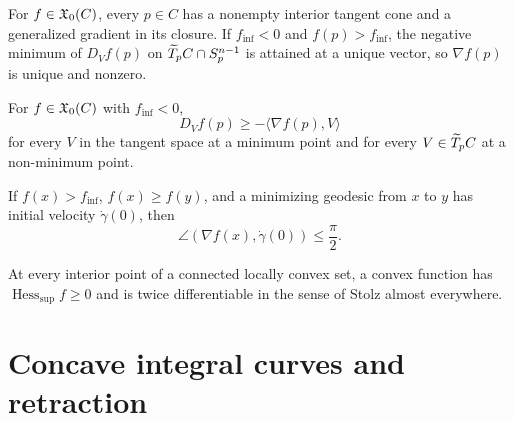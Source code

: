 \begin{lemma}
\label{lem:chow-iii-h36-unique-generalized-gradient}
For $f\in\mathfrak X_0(C)$, every $p\in C$ has a nonempty interior tangent cone and a
generalized gradient in its closure.  If $f_{\inf}<0$ and $f(p)>f_{\inf}$, the negative
minimum of $D_Vf(p)$ on $\widetilde T_pC\cap S_p^{n-1}$ is attained at a unique vector, so
$\nabla f(p)$ is unique and nonzero.
\end{lemma}

\begin{lemma}
\label{lem:chow-iii-h37-directional-gradient-inequality}
For $f\in\mathfrak X_0(C)$ with $f_{\inf}<0$,
\[
D_Vf(p)\ge-\langle\nabla f(p),V\rangle
\]
for every $V$ in the tangent space at a minimum point and for every $V\in\widetilde T_pC$
at a non-minimum point.
\end{lemma}

\begin{lemma}
\label{lem:chow-iii-h38-acute-angle}
If $f(x)>f_{\inf}$, $f(x)\ge f(y)$, and a minimizing geodesic from $x$ to $y$ has
initial velocity $\dot\gamma(0)$, then
\[
\angle(\nabla f(x),\dot\gamma(0))\le\frac\pi2.
\]
\end{lemma}

\begin{lemma}
\label{lem:chow-iii-h39-convex-support-hessian}
At every interior point of a connected locally convex set, a convex function has
$\operatorname{Hess}_{\mathrm{sup}}f\ge0$ and is twice differentiable in the sense of
Stolz almost everywhere.
\end{lemma}

\section{Concave integral curves and retraction}

